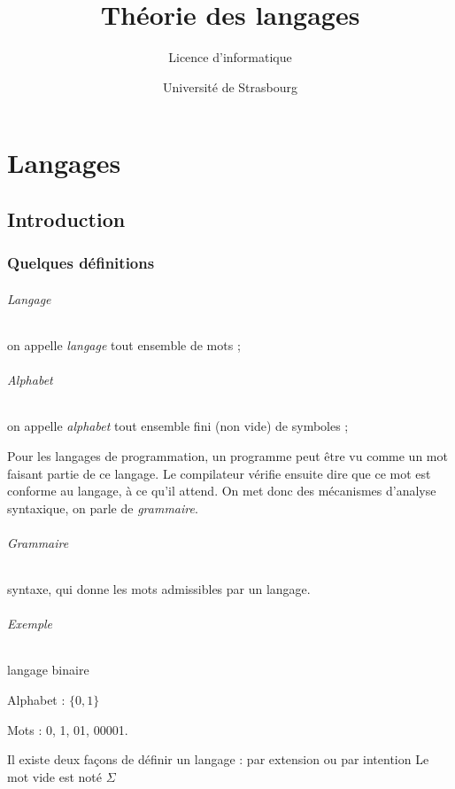 \documentclass[12pt, a4paper]{report}
\title{Théorie des langages}
\author{Licence d'informatique}
\date{Université de Strasbourg}
\begin{document}
\maketitle

\part{Langages}
%
%

\chapter{Introduction}

\section*{Quelques définitions}

\paragraph{Langage} on appelle \textit{langage} tout ensemble de mots ;

\paragraph{Alphabet} on appelle \textit{alphabet} tout ensemble fini (non vide) de symboles ;


Pour les langages de programmation, un programme peut être vu comme un mot faisant partie de ce langage. Le compilateur vérifie ensuite dire que ce mot est conforme au langage, à ce qu’il attend. On met donc des mécanismes d’analyse syntaxique, on parle de \textit{grammaire}.


\paragraph{Grammaire} syntaxe, qui donne les mots admissibles par un langage.

\paragraph{Exemple} langage binaire

Alphabet : $\{0, 1\}$

Mots : 0, 1, 01, 00001.

Il existe deux façons de définir un langage : par extension ou par intention Le mot vide est noté $\Sigma$
\end{document}
